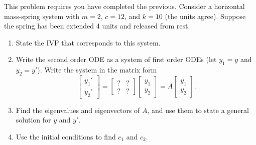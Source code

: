 \begin{problem}
 This problem requires you have completed the previous. 
 Consider a horizontal mass-spring system with $m=2$, $c=12$, and $k=10$ (the units agree). Suppose the spring has been extended 4 units and released from rest. 
\begin{enumerate}
 \item State the IVP that corresponds to this system.
 \item Write the second order ODE as a system of first order ODEs (let $y_1=y$ and $y_2=y'$). Write the system in the matrix form 
$$
\begin{bmatrix}
 y_1'\\y_2'
\end{bmatrix}
=\begin{bmatrix}
 ?&?\\?&?
\end{bmatrix}
\begin{bmatrix}
 y_1\\y_2
\end{bmatrix}
=A
\begin{bmatrix}
 y_1\\y_2
\end{bmatrix}
.$$
\item Find the eigenvalues and eigenvectors of $A$, and use them to state a general solution for $y$ and $y'$.
\item Use the initial conditions to find $c_1$ and $c_2$. 
\end{enumerate}
\end{problem}

